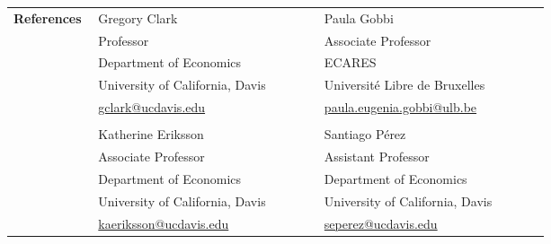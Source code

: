 \documentclass[letterpaper,11pt,oneside]{article}
\begin{document}
    \noindent \begin{longtable}{@{} p{0.15\linewidth} p{0.4\linewidth} p{0.4\linewidth}}
     \textbf{\large{References}}    &     Gregory Clark  & Paula Gobbi \\

     & Professor &  Associate Professor \\
     & Department of Economics & ECARES \\
     & University of California, Davis & Universit\'{e} Libre de Bruxelles  \\
     & \href{mailto:gclark@ucdavis.edu}{gclark@ucdavis.edu}  & \href{mailto:paula.eugenia.gobbi@ulb.be}{paula.eugenia.gobbi@ulb.be}  \\
     \\
     &  Katherine Eriksson  & Santiago P\'{e}rez  \\
     & Associate Professor  &Assistant Professor  \\
     & Department of Economics &   Department of Economics \\
     & University of California, Davis & University of California, Davis  \\
     & \href{mailto:kaeriksson@ucdavis.edu}{kaeriksson@ucdavis.edu}& \href{mailto:seperez@ucdavis.edu}{seperez@ucdavis.edu}   \\
      \end{longtable}



\end{document}
